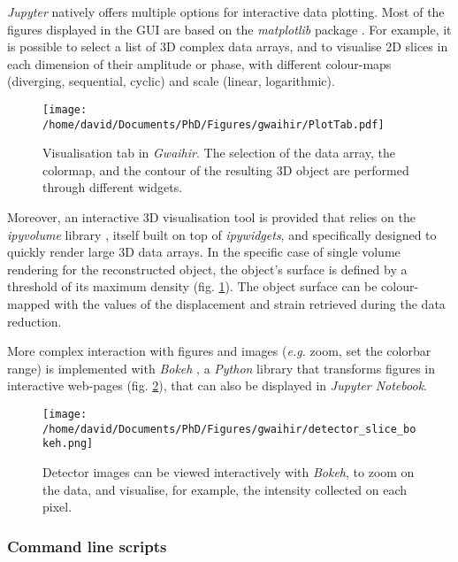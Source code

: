 \textit{Jupyter} natively offers multiple options for interactive data plotting.
Most of the figures displayed in the GUI are based on the \textit{matplotlib} package \parencite{Hunter2007}.
For example, it is possible to select a list of 3D complex data arrays, and to visualise 2D slices in each dimension of their amplitude or phase, with different colour-maps (diverging, sequential, cyclic) and scale (linear, logarithmic).

\begin{figure}[!htb]
    \centering
    \texttt{[image: /home/david/Documents/PhD/Figures/gwaihir/PlotTab.pdf]}
    \caption{
    Visualisation tab in \textit{Gwaihir}.
    The selection of the data array, the colormap, and the contour of the resulting 3D object are performed through different widgets.
    }
    \label{fig:3D_object}
\end{figure}

Moreover, an interactive 3D visualisation tool is provided that relies on the \textit{ipyvolume} library \parencite{Breddeld2021}, itself built on top of \textit{ipywidgets}, and specifically designed to quickly render large 3D data arrays.
In the specific case of single volume rendering for the reconstructed object, the object's surface is defined by a threshold of its maximum density (fig. \ref{fig:3D_object}).
The object surface can be colour-mapped with the values of the displacement and strain retrieved during the data reduction.

More complex interaction with figures and images (\textit{e.g.} zoom, set the colorbar range) is implemented with \textit{Bokeh} \parencite{Bokeh}, a \textit{Python} library that transforms figures in interactive web-pages (fig. \ref{fig:BokehDetector}), that can also be displayed in \textit{Jupyter Notebook}.

\begin{figure}[!htb]
    \centering
    \texttt{[image: /home/david/Documents/PhD/Figures/gwaihir/detector\_slice\_bokeh.png]}
    \caption{
    Detector images can be viewed interactively with \textit{Bokeh}, to zoom on the data, and visualise, for example, the intensity collected on each pixel.
    }
    \label{fig:BokehDetector}
\end{figure}

\subsubsection{Command line scripts}

